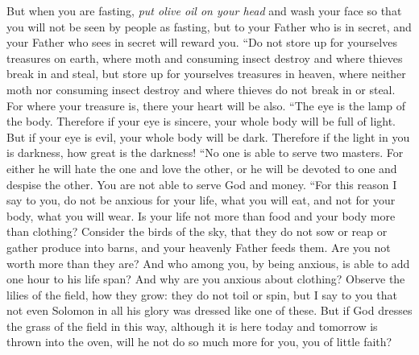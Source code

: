 \begin{biblechapter}
\verse But when you are fasting, \textit{put olive oil on your head} and wash your face
\verse so that you will not be seen by people as fasting, but to your Father who is in secret, and your Father who sees in secret will reward you.
 “Do not store up for yourselves treasures on earth, where moth and consuming insect destroy and where thieves break in and steal,
\verse but store up for yourselves treasures in heaven, where neither moth nor consuming insect destroy and where thieves do not break in or steal.
\verse For where your treasure is, there your heart will be also.
\verse “The eye is the lamp of the body. Therefore if your eye is sincere, your whole body will be full of light.
\verse But if your eye is evil, your whole body will be dark. Therefore if the light in you is darkness, how great is the darkness!
\verse “No one is able to serve two masters. For either he will hate the one and love the other, or he will be devoted to one and despise the other. You are not able to serve God and money.
 “For this reason I say to you, do not be anxious for your life, what you will eat, and not for your body, what you will wear. Is your life not more than food and your body more than clothing?
\verse Consider the birds of the sky, that they do not sow or reap or gather produce into barns, and your heavenly Father feeds them. Are you not worth more than they are?
\verse And who among you, by being anxious, is able to add one hour to his life span?
\verse And why are you anxious about clothing? Observe the lilies of the field, how they grow: they do not toil or spin,
\verse but I say to you that not even Solomon in all his glory was dressed like one of these.
\verse But if God dresses the grass of the field in this way, although it is here today and tomorrow is thrown into the oven, will he not do so much more for you, you of little faith?

\end{biblechapter}
